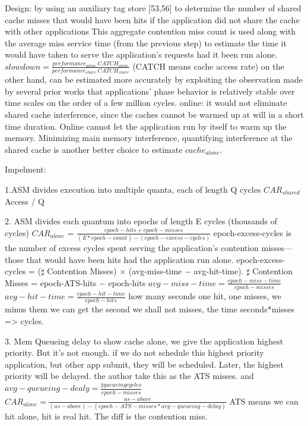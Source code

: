 \documentclass[UTF8]{article}
\begin{document}
    Design: by using an auxiliary tag store [53,56] to determine the number of shared cache misses that would have been hits if the application did not share the cache with other applications This aggregate contention miss count is used along with the average miss service time (from the previous step) to estimate the time it would have taken to serve the application’s requests had it been run alone.   $slowdown = \frac{performance_{alone} ~ CATCH_{alone}}{performance_{share} ~ CATCH_{share}}$ (CATCH means cache access rate) on the other hand, can be estimated more accurately by exploiting the observation made by several prior works that applications’ phase behavior is relatively stable over time scales on the order of a few million cycles.   online: it would not eliminate shared cache interference, since the caches cannot be warmed up at will in a short time duration.  Online cannot let the application run by itself to warm up the memory. Minimizing main memory interference, quantifying interference at the shared cache is another better choice to estimate $cache_{alone}$. 
    
    Impelment: 
    
    1.ASM divides execution into multiple quanta, each of length Q cycles $ CAR_{shared}$ Access / Q 
    
    2. ASM divides each quantum into epochs of length E cycles (thousands of cycles)  $CAR_{alone}$   = $\frac{epoch-hits + epoch-misses}{(E*epoch-count) - (epoch-excess-cycles)}$   epoch-excess-cycles is the number of excess cycles spent serving the application’s contention misses—those that would have been hits had the application run alone.  epoch-excess-cycles = ($\sharp$ Contention Misses) × (avg-miss-time − avg-hit-time). $\sharp$ Contention Misses = epoch-ATS-hits − epoch-hits $avg-miss-time = \frac{epoch-miss-time}{epoch-misses}$ $avg-hit-time = \frac{epoch-hit-time}{epoch-hits}$ how many seconds one hit, one misses, we minus them we can get the second we shall not misses, the time seconds*misses => cycles. 
    
    3. Mem Queueing delay to show cache alone, we give the application highest priority. But it's not enough. if we do not schedule this highest priority application, but other app submit, they will be scheduled. Later, the highest priority will be delayed. the author take this as the ATS misses. and $avg-queueing-dealy = \frac{\sharp queueing cycles}{epoch-misses}$ $CAR_{alone} = \frac{as-above}{(as-above) - (epoch-ATS-misses*avg-queueing-delay)}$ ATS means we can hit alone, hit is real hit. The diff is the contention miss.
    
\end{document}
